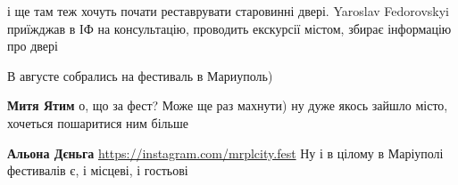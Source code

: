  
 
 
 
 

\qqSecCmt


і ще там теж хочуть почати реставрувати старовинні двері. Yaroslav Fedorovskyi
приїжджав в ІФ на консультацію, проводить екскурсії містом, збирає інформацію
про двері 🙂


В августе собрались на фестиваль в Мариуполь) 

\begin{itemize} %
\textbf{Митя Ятим} о, що за фест? Може ще раз махнути) ну дуже якось зайшло місто, хочеться пошаритися ним більше

\textbf{Альона Дєньга} \url{https://instagram.com/mrplcity.fest}
Ну і в цілому в Маріуполі фестивалів є, і місцеві, і гостьові

\end{itemize} %
